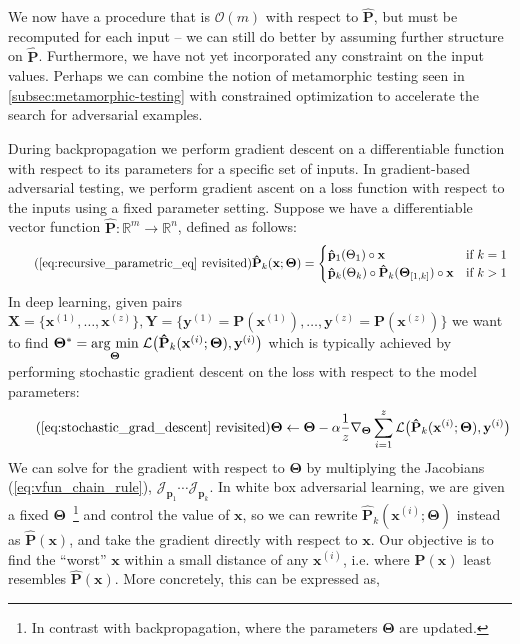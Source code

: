 We now have a procedure that is $\mathcal{O}(m)$ with respect to $\mathbf{\hat P}$, but must be recomputed for each input -- we can still do better by assuming further structure on $\mathbf{\hat P}$. Furthermore, we have not yet incorporated any constraint on the input values. Perhaps we can combine the notion of metamorphic testing seen in \autoref{subsec:metamorphic-testing} with constrained optimization to accelerate the search for adversarial examples.

During backpropagation we perform gradient descent on a differentiable function with respect to its parameters for a specific set of inputs. In gradient-based adversarial testing, we perform gradient ascent on a loss function with respect to the inputs using a fixed parameter setting. Suppose we have a differentiable vector function $\mathbf{\hat P}: \mathbb{R}^m\rightarrow\mathbb{R}^n$, defined as follows:
%
\begin{equation} \tag{\autoref{eq:recursive_parametric_eq} revisited}
\mathbf{\hat P}_k(\mathbf{x}; \bm\Theta) = \begin{cases} \mathbf{\hat p}_1(\Theta_1)\circ\mathbf{x} &\text{if } k=1\\ \mathbf{\hat p}_k(\Theta_k)\circ \mathbf{\hat P}_{k}(\bm\Theta_{[1, k]})\circ\mathbf{x}&\text{if } k > 1 \end{cases} \\
\end{equation}
%
In deep learning, given pairs $\mathbf{X} = \{\mathbf{x}^{(1)}, \dots, \mathbf{x}^{(z)}\}, \mathbf{Y} = \{\mathbf{y}^{(1)} = \mathbf{P}(\mathbf{x}^{(1)}), \dots, \mathbf{y}^{(z)} = \mathbf{P}(\mathbf{x}^{(z)})\}$ we want to find $\bm\Theta^* = \underset{\boldsymbol{\Theta}}{\operatorname{arg}\,\operatorname{min}}\;\mathcal{L}\big(\mathbf{\hat P}_k(\mathbf{x}^{(i)}; \bm\Theta), \mathbf{y}^{(i)}\big)$ which is typically achieved by performing stochastic gradient descent on the loss with respect to the model parameters:
%
\begin{equation} \tag{\autoref{eq:stochastic_grad_descent} revisited}
\bm\Theta \leftarrow \bm\Theta - \alpha\frac{1}{z}\nabla_{\bm\Theta} \sum_{i=1}^z\mathcal{L}\big(\mathbf{\hat P}_k(\mathbf{x}^{(i)}; \bm\Theta), \mathbf{y}^{(i)}\big)
\end{equation}
%
We can solve for the gradient with respect to $\bm\Theta$ by multiplying the Jacobians (\autoref{eq:vfun_chain_rule}), $\mathcal{J}_{\mathbf{p}_1} \cdots \mathcal{J}_{\mathbf{p}_k}$. In white box adversarial learning, we are given a fixed $\bm\Theta$~\footnote{In contrast with backpropagation, where the parameters $\bm\Theta$ are updated.} and control the value of $\mathbf x$, so we can rewrite $\mathbf{\hat P}_k(\mathbf{x}^{(i)};\bm\Theta)$ instead as $\mathbf{\hat P}(\mathbf x)$, and take the gradient directly with respect to $\mathbf x$. Our objective is to find the ``worst'' $\mathbf x$ within a small distance of any $\mathbf x^{(i)}$, i.e. where $\mathbf{P}(\mathbf x)$ least resembles $\mathbf{\hat P}(\mathbf x)$. More concretely, this can be expressed as,
